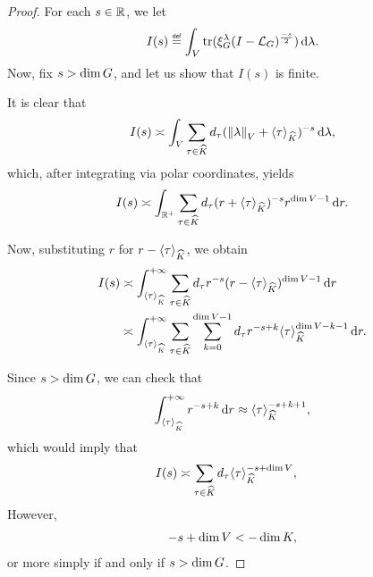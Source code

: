 \begin{proof}
    For each $s \in \mathbb{R}$, we let
    \begin{align*}
        I(s) \defeq \int_\VectorSpace \tr(\Rep \lambda \BesselPotential {-s}) \dd \lambda.
    \end{align*}
    Now, fix $s > \dim G$, and let us show that $I(s)$ is finite.

    It is clear that
    \begin{align*}
        I(s) \asymp \int_V \sum_{\tau \in {\widehat{K}}} {d_{\tau}} ({\left\| \lambda \right\|}_{V} + {\langle \tau \rangle}_{{\widehat{K}}})^{-s} \,\mathrm{d} \lambda,
    \end{align*}
    which, after integrating via polar coordinates, yields
    \begin{align*}
        I(s) \asymp \int_{\mathbb{R}^+} \sum_{\tau \in {\widehat{K}}} {d_{\tau}} (r + {\langle \tau \rangle}_{{\widehat{K}}})^{-s} r^{\dim V - 1} \,\mathrm{d} r.
    \end{align*}

    Now, substituting $r$ for $r - {\langle \tau \rangle}_{{\widehat{K}}}$,
    we obtain
    \begin{align*}
        I(s) &\asymp \int_{{\langle \tau \rangle}_{{\widehat{K}}}}^{+\infty} \sum_{\tau \in {\widehat{K}}} {d_{\tau}} r^{-s} (r - {\langle \tau \rangle}_{{\widehat{K}}})^{\dim V - 1} \,\mathrm{d} r\\
        &\asymp \int_{{\langle \tau \rangle}_{{\widehat{K}}}}^{+\infty} \sum_{\tau \in {\widehat{K}}} \sum_{k = 0}^{\dim V - 1} {d_{\tau}} r^{-s + k} {\langle \tau \rangle}_{{\widehat{K}}}^{\dim V - k - 1} \,\mathrm{d} r.
    \end{align*}

    Since $s > \dim G$,
    we can check that
    \begin{align*}
        \int_{{\langle \tau \rangle}_{{\widehat{K}}}}^{+\infty} r^{-s + k} \,\mathrm{d} r \approx {\langle \tau \rangle}_{{\widehat{K}}}^{-s + k + 1},
    \end{align*}
    which would imply that
    \begin{align*}
        I(s)
        &\asymp \sum_{\tau \in {\widehat{K}}} {d_{\tau}} {\langle \tau \rangle}_{{\widehat{K}}}^{-s + \dim V},
    \end{align*}
    However, \cite[Lemma 6.3]{Fischer2015}
    \begin{align*}
        -s + \dim V < -\dim K,
    \end{align*}
    or more simply if and only if $s > \dim G$.
\end{proof}


